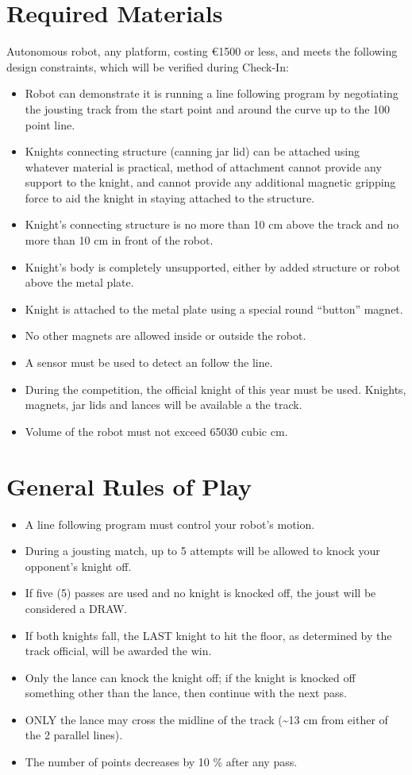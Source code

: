 \documentclass[a4paper,12pt]{article}
\begin{document}
\section{Required Materials}
Autonomous robot, any platform, costing \euro{1500} or less, and meets the following design
constraints, which will be verified during Check-In:
\begin{itemize}
\item Robot can demonstrate it is running a line following program by negotiating the jousting track
from the start point and around the curve up to the 100 point line.
\item Knights connecting structure (canning jar lid) can be attached using whatever material is
practical, method of attachment cannot provide any support to the knight, and cannot provide
any additional magnetic gripping force to aid the knight in staying attached to the structure.
\item Knight’s connecting structure is no more than 10
cm above the track and no more than 10 cm in front of the robot.
\item Knight’s body is completely unsupported, either by added structure or robot above the metal
plate.
\item Knight is attached to the metal plate using a special round “button” magnet.
\item No other magnets are allowed inside or outside the robot.
\item A sensor must be used to detect an follow the line.
\item During the competition, the official knight of this year must be used. Knights, magnets, jar lids and lances will be available a the track.
\item Volume of the robot must not exceed 65030 cubic cm.
\end{itemize}
\section{General Rules of Play}
\begin{itemize}
	\item A line following program must control your robot’s motion.
	\item During a jousting match, up to 5 attempts will be allowed to knock your opponent’s knight off.
	\item If five (5) passes are used and no knight is knocked off, the joust will be considered a DRAW.
	\item If both knights fall, the LAST knight to hit the floor, as determined by the track official, will be
	awarded the win.
	\item Only the lance can knock the knight off; if the knight is knocked off something other than the
		lance, then continue with the next pass.
	\item ONLY the lance may cross the midline of the track (\textasciitilde 13 cm from either of the 2 parallel lines).
	\item The number of points decreases by 10 \% after any pass.
\end{itemize}
\end{document}
